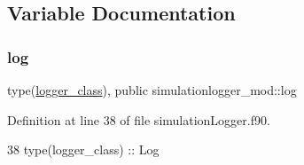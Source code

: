 \subsection{Variable Documentation}
\mbox{\label{namespacesimulationlogger__mod_a0d667ffec2a1129f89f4bd8fe6dc8a43}} 
\subsubsection{\texorpdfstring{log}{log}}
{\footnotesize\ttfamily type(\mbox{\hyperlink{structsimulationlogger__mod_1_1logger__class}{logger\+\_\+class}}), public simulationlogger\+\_\+mod\+::log}



Definition at line 38 of file simulation\+Logger.\+f90.


\begin{DoxyCode}
38     \textcolor{keywordtype}{type}(logger\_class) :: Log
\end{DoxyCode}
